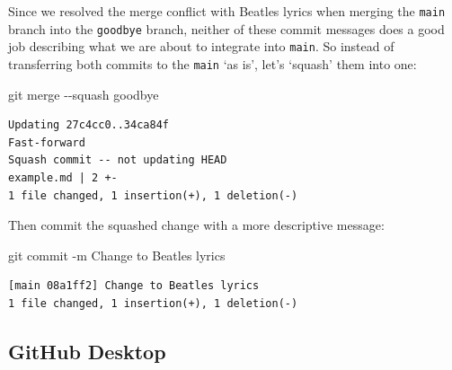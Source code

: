 \documentclass[
  letterpaper,
  DIV=11,
  numbers=noendperiod]{scrartcl}
\newenvironment{Shaded}{\begin{snugshade}}{\end{snugshade}}
\newcommand{\AttributeTok}[1]{\textcolor[rgb]{0.40,0.45,0.13}{#1}}
\newcommand{\FunctionTok}[1]{\textcolor[rgb]{0.28,0.35,0.67}{#1}}
\newcommand{\NormalTok}[1]{\textcolor[rgb]{0.00,0.23,0.31}{#1}}
\newcommand{\StringTok}[1]{\textcolor[rgb]{0.13,0.47,0.30}{#1}}
\begin{document}
Since we resolved the merge conflict with Beatles lyrics when merging
the \texttt{main} branch into the \texttt{goodbye} branch, neither of
these commit messages does a good job describing what we are about to
integrate into \texttt{main}. So instead of transferring both commits to
the \texttt{main} `as is', let's `squash' them into one:

\begin{Shaded}
\begin{Highlighting}[]
\FunctionTok{git}\NormalTok{ merge }\AttributeTok{{-}{-}squash}\NormalTok{ goodbye}
\end{Highlighting}
\end{Shaded}

\begin{verbatim}
Updating 27c4cc0..34ca84f
Fast-forward
Squash commit -- not updating HEAD
example.md | 2 +-
1 file changed, 1 insertion(+), 1 deletion(-)
\end{verbatim}

Then commit the squashed change with a more descriptive message:

\begin{Shaded}
\begin{Highlighting}[]
\FunctionTok{git}\NormalTok{ commit }\AttributeTok{{-}m} \StringTok{\textquotesingle{}Change to Beatles lyrics\textquotesingle{}}
\end{Highlighting}
\end{Shaded}

\begin{verbatim}
[main 08a1ff2] Change to Beatles lyrics
1 file changed, 1 insertion(+), 1 deletion(-)
\end{verbatim}

\subsection{GitHub Desktop}
\end{document}
